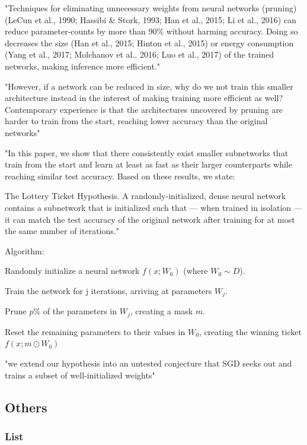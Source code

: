 \documentclass[english]{article}
\begin{document}
"Techniques for eliminating unnecessary weights from neural networks (pruning) (LeCun et al., 1990;
Hassibi \& Stork, 1993; Han et al., 2015; Li et al., 2016) can reduce parameter-counts by more than
90\% without harming accuracy. Doing so decreases the size (Han et al., 2015; Hinton et al., 2015)
or energy consumption (Yang et al., 2017; Molchanov et al., 2016; Luo et al., 2017) of the trained
networks, making inference more efficient." 

"However, if a network can be reduced in size, why do we
not train this smaller architecture instead in the interest of making training more efficient as well?
Contemporary experience is that the architectures uncovered by pruning are harder to train from the
start, reaching lower accuracy than the original networks"

"In this paper, we show that there consistently exist smaller subnetworks that train from the start and
learn at least as fast as their larger counterparts while reaching similar test accuracy. Based on these results, we state: 


The Lottery Ticket Hypothesis. A randomly-initialized, dense neural network contains a subnetwork that is initialized such that — when trained in isolation — it can match the test accuracy of the
original network after training for at most the same number of iterations."

Algorithm: 

\benum
\item  Randomly initialize a neural network $f(x;W_0)$ (where $W_0 \sim D$).
\item  Train the network for j iterations, arriving at parameters $W_j$.
\item  Prune $p$\% of the parameters in $W_j$, creating a mask $m$.
\item  Reset the remaining parameters to their values in $W_0$, creating the winning ticket $f(x;m\odot W_0)$
\eenum 

"we extend our hypothesis
into an untested conjecture that SGD seeks out and trains a subset of well-initialized weights"



\eenum


\subsection{Others}


\subsubsection{List}
\end{document}
